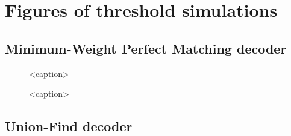 \chapter{Figures of threshold simulations}\label{ap:figures}

\section{Minimum-Weight Perfect Matching decoder}\label{ap:figmwpm}


\begin{figure}[htb]
    \centering
    \begin{subfigure}[b]{\textwidth}
        
    \end{subfigure}
    \begin{subfigure}[b]{\textwidth}
        
    \end{subfigure}
    \caption{<caption>}
    \label{fig:thres_mwpm_2d}
\end{figure}
\begin{figure}[htb]
    \centering
    \begin{subfigure}[b]{\textwidth}
        
    \end{subfigure}
    \begin{subfigure}[b]{\textwidth}
        
    \end{subfigure}
    \caption{<caption>}
    \label{fig:thres_mwpm_3d}
\end{figure}


\section{Union-Find decoder}\label{ap:figuf}

